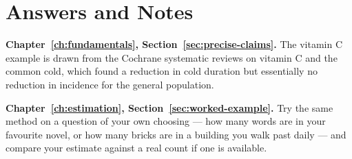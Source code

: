 \chapter{Answers and Notes}
\label{ch:answers}

\textbf{Chapter~\ref{ch:fundamentals}, Section~\ref{sec:precise-claims}.}
The vitamin C example is drawn from the Cochrane systematic reviews on
vitamin C and the common cold, which found a reduction in cold
duration but essentially no reduction in incidence for the general
population.

\textbf{Chapter~\ref{ch:estimation}, Section~\ref{sec:worked-example}.}
Try the same method on a question of your own choosing — how many
words are in your favourite novel, or how many bricks are in a
building you walk past daily — and compare your estimate against a
real count if one is available.
